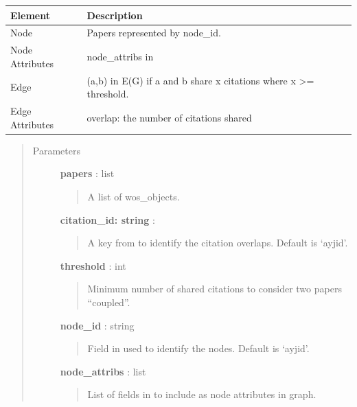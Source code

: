 \documentclass[letterpaper,10pt,english]{sphinxmanual}
\begin{document}
\begin{fulllineitems}
\begin{tabulary}{\linewidth}{|L|L|}
\hline
\textbf{
Element
} & \textbf{
Description
}\\\hline

Node
 & 
Papers represented by node\_id.
\\\hline

Node Attributes
 & 
node\_attribs in {\hyperref[tethne:tethne.data.Paper]{}}
\\\hline

Edge
 & 
(a,b) in E(G) if a and b share x citations where x \textgreater{}=
threshold.
\\\hline

Edge Attributes
 & 
overlap: the number of citations shared
\\\hline
\end{tabulary}

\begin{quote}\begin{description}
\item[{Parameters }] \leavevmode
\textbf{papers} : list
\begin{quote}

A list of wos\_objects.
\end{quote}

\textbf{citation\_id: string} :
\begin{quote}

A key from {\hyperref[tethne:tethne.data.Paper]{}} to identify the citation overlaps.  Default
is `ayjid'.
\end{quote}

\textbf{threshold} : int
\begin{quote}

Minimum number of shared citations to consider two papers ``coupled''.
\end{quote}

\textbf{node\_id} : string
\begin{quote}

Field in {\hyperref[tethne:tethne.data.Paper]{}} used to identify the nodes. Default is `ayjid'.
\end{quote}

\textbf{node\_attribs} : list
\begin{quote}

List of fields in {\hyperref[tethne:tethne.data.Paper]{}} to include as node attributes in
graph.
\end{quote}


\end{description}
\end{quote}
\end{fulllineitems}
\end{document}
